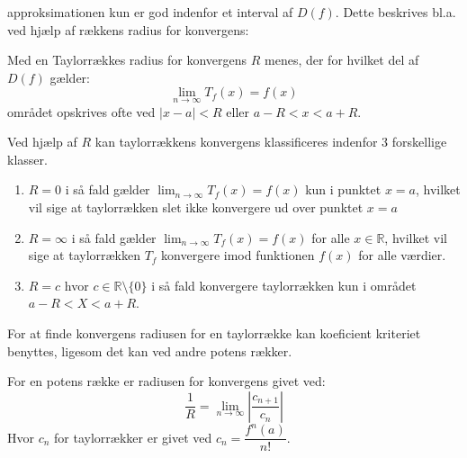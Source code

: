 approksimationen kun er god indenfor et interval af $D(f)$. Dette beskrives bl.a. ved hjælp af rækkens
radius for konvergens:
\begin{defn} %
    Med en Taylorrækkes radius for konvergens $R$ menes, der for hvilket del af $D(f)$ gælder:
    \[
        \lim_{n \rightarrow \infty} T_f(x) = f(x)
    \]
    området opskrives ofte ved $|x-a| < R$ eller $a - R < x < a + R$.
\end{defn}
Ved hjælp af $R$ kan taylorrækkens konvergens klassificeres indenfor 3 forskellige klasser.
\begin{enumerate} %
    \item $R = 0$ i så fald gælder $\lim_{n \rightarrow \infty} T_f(x) = f(x)$ kun i punktet $x = a$,
    hvilket vil sige at taylorrækken slet ikke konvergere ud over punktet $x = a$
    \item $R = \infty$ i så fald gælder $\lim_{n \rightarrow \infty} T_f(x) = f(x)$ for alle $x \in \mathbb{R}$,
    hvilket vil sige at taylorrækken $T_f$ konvergere imod funktionen $f(x)$ for alle værdier.
    \item $R = c$ hvor $c \in \mathbb{R}\setminus\{0\}$ i så fald konvergere taylorrækken kun i området $a - R < X < a + R$.
\end{enumerate}
For at finde konvergens radiusen for en taylorrække kan koeficient kriteriet benyttes, ligesom det kan ved andre potens rækker.
\begin{defn} %
    For en potens række er radiusen for konvergens givet ved:
    \[
        \frac{1}{R} = \lim_{n \rightarrow \infty} \left\lvert \frac{c_{n + 1}}{c_n} \right\lvert
    \]
    Hvor $c_n$ for taylorrækker er givet ved $c_n = \dfrac{f^n(a)}{n!}$.
\end{defn} %

